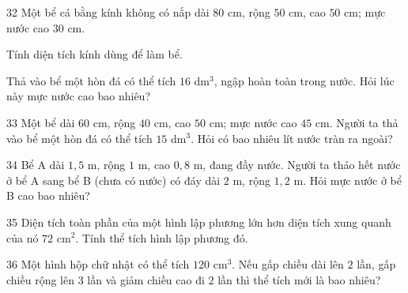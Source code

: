 \gap
\begin{probbox}{32}{}
Một bể cá bằng kính không có nắp dài $80$ cm, rộng $50$ cm, cao $50$ cm; mực nước cao $30$ cm.\par
{} Tính diện tích kính dùng để làm bể.\par
{} Thả vào bể một hòn đá có thể tích $16$ dm$^3$, ngập hoàn toàn trong nước. Hỏi lúc này mực nước cao bao nhiêu?
\end{probbox}
\gap
\begin{probbox}{33}{}
Một bể dài $60$ cm, rộng $40$ cm, cao $50$ cm; mực nước cao $45$ cm. Người ta thả vào bể một hòn đá có thể tích $15$ dm$^3$. Hỏi có bao nhiêu lít nước tràn ra ngoài?
\end{probbox}
\gap
\begin{probbox}{34}{}
Bể A dài $1{,}5$ m, rộng $1$ m, cao $0{,}8$ m, đang đầy nước. Người ta tháo hết nước ở bể A sang bể B (chưa có nước) có đáy dài $2$ m, rộng $1{,}2$ m. Hỏi mực nước ở bể B cao bao nhiêu?
\end{probbox}
\gap
\begin{probbox}{35}{}
Diện tích toàn phần của một hình lập phương lớn hơn diện tích xung quanh của nó $72$ cm$^2$. Tính thể tích hình lập phương đó.
\end{probbox}
\gap
\begin{probbox}{36}{}
Một hình hộp chữ nhật có thể tích $120$ cm$^3$. Nếu gấp chiều dài lên $2$ lần, gấp chiều rộng lên $3$ lần và giảm chiều cao đi $2$ lần thì thể tích mới là bao nhiêu?
\end{probbox}
